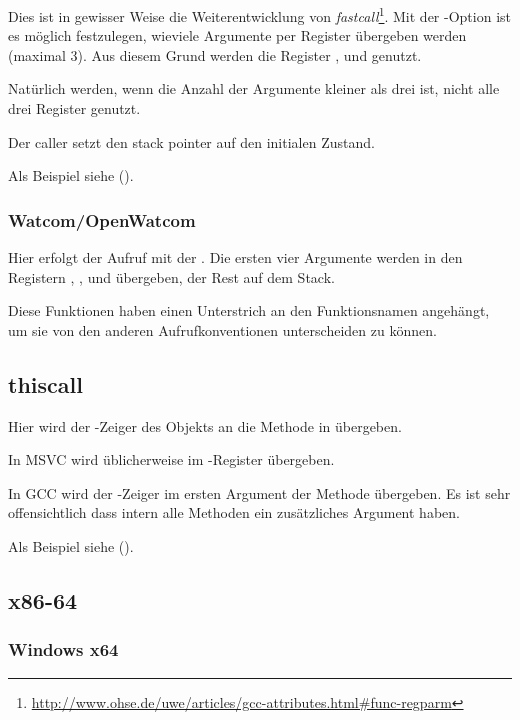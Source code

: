 \newcommand{\URLREGPARMM}{\url{http://www.ohse.de/uwe/articles/gcc-attributes.html\#func-regparm}}

Dies ist in gewisser Weise die Weiterentwicklung von \emph{fastcall}\footnote{\URLREGPARMM}.
Mit der -Option ist es möglich festzulegen, wieviele Argumente per Register
übergeben werden (maximal 3).
Aus diesem Grund werden die Register \EAX, \EDX und \ECX genutzt.

Natürlich werden, wenn die Anzahl der Argumente kleiner als drei ist, nicht alle drei
Register genutzt.

Der \gls{caller} setzt den \gls{stack pointer} auf den initialen Zustand.

Als Beispiel siehe ().

\subsubsection{Watcom/OpenWatcom}

Hier erfolgt der Aufruf mit der .
Die ersten vier Argumente werden in den Registern \EAX, \EDX, \EBX und \ECX übergeben,
der Rest auf dem Stack.

Diese Funktionen haben einen Unterstrich an den Funktionsnamen angehängt, um sie von
den anderen Aufrufkonventionen unterscheiden zu können.

\subsection{thiscall}

Hier wird der \ITthis-Zeiger des Objekts an die Methode in \Cpp übergeben.

In MSVC wird \ITthis üblicherweise im \ECX-Register übergeben.

In GCC wird der \ITthis-Zeiger im ersten Argument der Methode übergeben.
Es ist sehr offensichtlich dass intern alle Methoden ein zusätzliches Argument haben.

Als Beispiel siehe ().

\subsection{x86-64}

\subsubsection{Windows x64}
\label{sec:callingconventions_win64}

